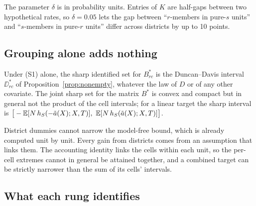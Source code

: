 The parameter $\delta$ is in probability units. Entries of $K$ are half-gaps
between two hypothetical rates, so $\delta=0.05$ lets the gap between
``$r$-members in pure-$s$ units'' and ``$s$-members in pure-$r$ units'' differ
across districts by up to 10 points.

\subsection{Grouping alone adds nothing}

\begin{proposition}\label{prop:D0}
Under (S1) alone, the sharp identified set for $B^*_{rc}$ is the Duncan--Davis
interval $\DD^*_{rc}$ of Proposition~\ref{prop:nonempty}, whatever the law of $D$
or of any other covariate. The joint sharp set for the matrix $B^*$ is convex and
compact but in general not the product of the cell intervals; for a linear
target the sharp interval is
$\big[-\E[N\,h_S(-\tilde a(X);X,T)],\ \E[N\,h_S(\tilde a(X);X,T)]\big]$.
\end{proposition}
\begin{reading}
District dummies cannot narrow the model-free bound, which is already computed
unit by unit. Every gain from districts comes from an assumption that links
them. The accounting identity links the cells within each unit, so the per-cell
extremes cannot in general be attained together, and a combined target can be
strictly narrower than the sum of its cells' intervals.
\end{reading}

\subsection{What each rung identifies}

